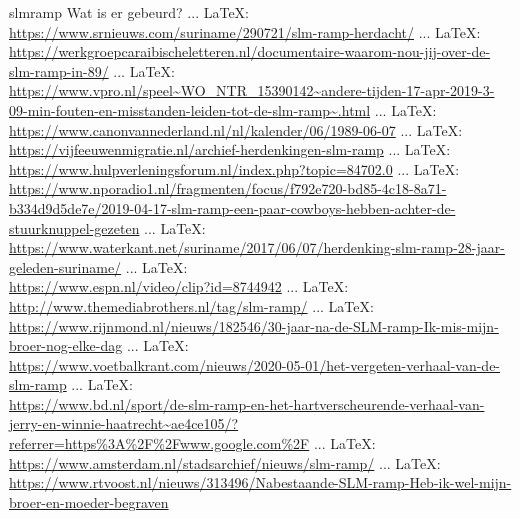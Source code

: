\begin{thebibliography}{99}
{{{{{{{							
							slmramp
							Wat is er gebeurd?
							 ... \LaTeX:\\ \url{https://www.srnieuws.com/suriname/290721/slm-ramp-herdacht/}
							 ... \LaTeX:\\ \url{https://werkgroepcaraibischeletteren.nl/documentaire-waarom-nou-jij-over-de-slm-ramp-in-89/}
							 ... \LaTeX:\\ \url{https://www.vpro.nl/speel~WO_NTR_15390142~andere-tijden-17-apr-2019-3-09-min-fouten-en-misstanden-leiden-tot-de-slm-ramp~.html}
							 ... \LaTeX:\\ \url{https://www.canonvannederland.nl/nl/kalender/06/1989-06-07}
							 ... \LaTeX:\\ \url{https://vijfeeuwenmigratie.nl/archief-herdenkingen-slm-ramp}
							 ... \LaTeX:\\ \url{https://www.hulpverleningsforum.nl/index.php?topic=84702.0}
							 ... \LaTeX:\\ \url{https://www.nporadio1.nl/fragmenten/focus/f792e720-bd85-4c18-8a71-b334d9d5de7e/2019-04-17-slm-ramp-een-paar-cowboys-hebben-achter-de-stuurknuppel-gezeten}
							 ... \LaTeX:\\ \url{https://www.waterkant.net/suriname/2017/06/07/herdenking-slm-ramp-28-jaar-geleden-suriname/}
							 ... \LaTeX:\\ \url{https://www.espn.nl/video/clip?id=8744942}
							 ... \LaTeX:\\ \url{http://www.themediabrothers.nl/tag/slm-ramp/}
							 ... \LaTeX:\\ \url{https://www.rijnmond.nl/nieuws/182546/30-jaar-na-de-SLM-ramp-Ik-mis-mijn-broer-nog-elke-dag}
							 ... \LaTeX:\\ \url{https://www.voetbalkrant.com/nieuws/2020-05-01/het-vergeten-verhaal-van-de-slm-ramp}
							 ... \LaTeX:\\ \url{https://www.bd.nl/sport/de-slm-ramp-en-het-hartverscheurende-verhaal-van-jerry-en-winnie-haatrecht~ae4ce105/?referrer=https%3A%2F%2Fwww.google.com%2F}
							 ... \LaTeX:\\ \url{https://www.amsterdam.nl/stadsarchief/nieuws/slm-ramp/}
							 ... \LaTeX:\\ \url{https://www.rtvoost.nl/nieuws/313496/Nabestaande-SLM-ramp-Heb-ik-wel-mijn-broer-en-moeder-begraven}
}}}}}}}
\end{thebibliography}
